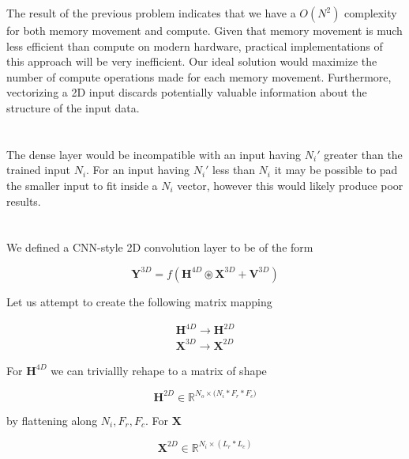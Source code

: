 \documentclass[12pt]{article}
\begin{document}
The result of the previous problem indicates that we have a $O(N^2)$
complexity for both memory movement and compute.
Given that memory movement is much less efficient than compute on
modern hardware, practical implementations of this approach will be
very inefficient. Our ideal solution would maximize the number of compute
operations made for each memory movement. Furthermore, vectorizing
a 2D input discards potentially valuable information about the
structure of the input data.

\section{}

The dense layer would be incompatible with an input having $N_i'$ greater than
the trained input $N_i$. For an input having $N_i'$ less than $N_i$ it may be
possible to pad the smaller input to fit inside a $N_i$ vector, however this
would likely produce poor results.

\section{}

We defined a CNN-style 2D convolution layer to be of the form

\begin{equation}
	\boldsymbol{Y}^{3D} =
		f\left(\boldsymbol{H}^{4D} \circledast \boldsymbol{X}^{3D} +
		\boldsymbol{V}^{3D}\right)
\end{equation}

Let us attempt to create the following matrix mapping

\begin{align}
	\boldsymbol{H}^{4D} \rightarrow \boldsymbol{H}^{2D} \\
	\boldsymbol{X}^{3D} \rightarrow \boldsymbol{X}^{2D}
\end{align}

For $\boldsymbol{H}^{4D}$ we can triviallly rehape to a matrix of shape

\begin{equation}
	\boldsymbol{H}^{2D} \in \mathbb{R}^{N_o \times \big(N_i * F_r * F_c\big)}
\end{equation}

by flattening along $N_i, F_r, F_c$. For $\boldsymbol{X}$

\begin{equation}
	\boldsymbol{X}^{2D} \in \mathbb{R}^{N_i \times (L_r *L_c)}
\end{equation}
\end{document}
